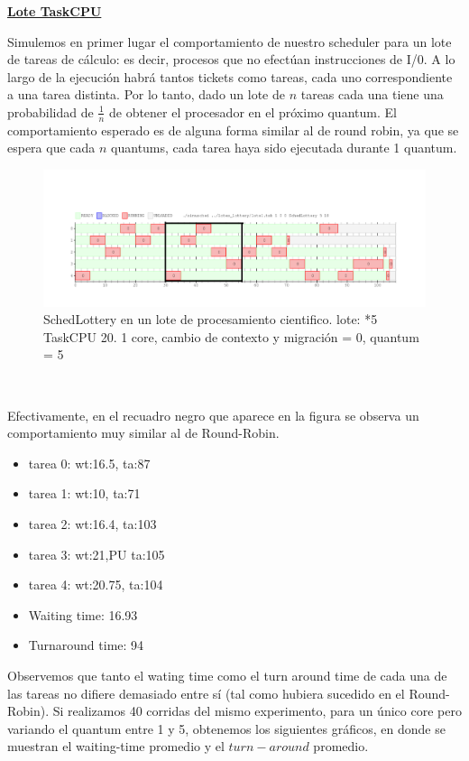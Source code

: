 \textbf{\underline{Lote TaskCPU}}

Simulemos en primer lugar el comportamiento de nuestro scheduler para un lote de tareas de cálculo: es decir, procesos que no 
efectúan instrucciones de I/0. A lo largo de la ejecución habrá tantos tickets como tareas, cada uno correspondiente a una
tarea distinta. Por lo tanto, dado un lote de $n$ tareas cada una tiene una probabilidad de $\frac{1}{n}$ de obtener el procesador
en el próximo quantum. El comportamiento esperado es de alguna forma similar al de round robin, ya que se espera que cada $n$
quantums, cada tarea haya sido ejecutada durante 1 quantum.


\begin{figure}[H]
  \centering\includegraphics[scale=0.5]{graficos/lottery_cpu.pdf}
  \caption{SchedLottery en un lote de procesamiento cientifico. lote: *5 TaskCPU 20.
	1 core, cambio de contexto y migración = 0, quantum = 5}
\end{figure}

~

Efectivamente, en el recuadro negro que aparece en la figura se observa un comportamiento muy similar al de Round-Robin.

\begin{itemize}
	\item tarea 0: wt:16.5, ta:87
	\item tarea 1: wt:10, ta:71
	\item tarea 2: wt:16.4, ta:103
	\item tarea 3: wt:21,PU ta:105
	\item tarea 4: wt:20.75, ta:104
	\item  Waiting time: 16.93
	\item  Turnaround time: 94
\end{itemize} 

Observemos que tanto el wating time como el turn around time de cada una de las tareas no difiere demasiado entre sí (tal como hubiera sucedido en el Round-Robin).
Si realizamos 40 corridas del mismo experimento, para un único core pero variando el quantum entre 1 y 5, obtenemos los siguientes gráficos, en donde se muestran
el waiting-time promedio y el $turn-around$ promedio.


